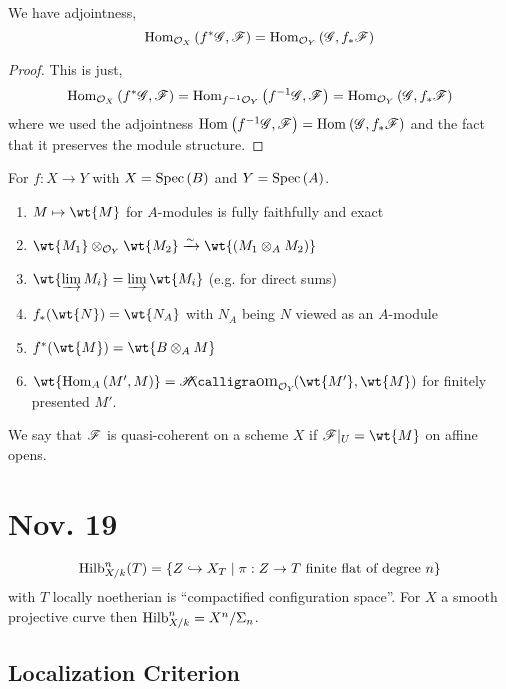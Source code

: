 \documentclass[12pt]{article}
\begin{document}
\begin{prop}
We have adjointness,
\[ \mathrm{Hom}_{\mathcal{O}_{X}} \left( f^* \mathscr{G}, \mathscr{F} \right) = \mathrm{Hom}_{\mathcal{O}_{Y}} \left( \mathscr{G}, f_* \mathscr{F} \right) \]
\end{prop}

\begin{proof}
This is just,
\[
\mathrm{Hom}_{\mathcal{O}_{X}} \left( f^*\mathscr{G}, \mathscr{F} \right) = \mathrm{Hom}_{f^{-1} \mathcal{O}_{Y}} \left( f^{-1} \mathscr{G}, \mathscr{F} \right) = \mathrm{Hom}_{\mathcal{O}_{Y}} \left( \mathscr{G}, f_* \mathscr{F} \right) \]
where we used the adjointness $\mathrm{Hom}_{} \left( f^{-1} \mathscr{G}, \mathscr{F} \right) = \mathrm{Hom}_{} \left( \mathscr{G}, f_* \mathscr{F} \right)$ and the fact that it preserves the module structure.
\end{proof}

\begin{thm}
For $f : X \to Y$ with $X = \mathrm{Spec}\left( B \right)$ and $Y = \mathrm{Spec}\left( A \right)$.
\begin{enumerate}
\item $M \mapsto \wt{M}$ for $A$-modules is fully faithfully and exact
\item $\wt{M_1} \ot_{\struct{Y}} \wt{M_2} \iso \wt{(M_1 \ot_A M_2)}$
\item $\wt{\varinjlim M_i} = \varinjlim \wt{M_i}$ (e.g. for direct sums)
\item $f_*(\wt{N}) = \wt{N_A}$ with $N_A$ being $N$ viewed as an $A$-module
\item $f^*(\wt{M}) = \wt{B \otimes_A M}$
\item $\wt{\Hom{A}{M'}{M}} = \shHom{\struct{Y}}{\wt{M'}}{\wt{M}}$ for finitely presented $M'$.
\end{enumerate}
\end{thm}

\begin{defn}
We say that $\mathscr{F}$ is quasi-coherent on a scheme $X$ if $\F|_U = \wt{M}$ on affine opens.
\end{defn}

\section{Nov. 19}

\begin{rmk}
\[ \mathrm{Hilb}^n_{X/k}(T) = \{ Z \hookrightarrow X_T \mid \pi : Z \to T \text{ finite flat of degree } n \} \]
with $T$ locally noetherian is ``compactified configuration space''. For $X$ a smooth projective curve then $\mathrm{Hilb}^n_{X/k} = X^n / \Sigma_n$.
\end{rmk}

\subsection{Localization Criterion}
\end{document}
